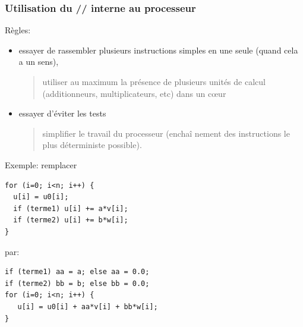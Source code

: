 \documentclass{beamer}
\begin{document}
\begin{frame}[fragile]
\frametitle{Utilisation du // interne au processeur}
Règles: 
\begin{itemize}
	\item essayer de rassembler plusieurs instructions simples en une seule (quand cela a un sens),
	\begin{quote}
		utiliser au maximum la pr\'esence de plusieurs unit\'es de calcul (additionneurs, multiplicateurs, etc) dans un c\oe ur
	\end{quote}
	\item  essayer d'\'eviter les tests
	\begin{quote}
		simplifier le travail du processeur (encha\^i nement des instructions le plus d\'eterministe possible).
	\end{quote}
\end{itemize}


\end{frame}

\begin{frame}[fragile]
Exemple: remplacer
\begin{lstlisting}
for (i=0; i<n; i++) {
  u[i] = u0[i];
  if (terme1) u[i] += a*v[i];
  if (terme2) u[i] += b*w[i];
}
\end{lstlisting}

par:
\begin{lstlisting}
if (terme1) aa = a; else aa = 0.0;
if (terme2) bb = b; else bb = 0.0;
for (i=0; i<n; i++) {
   u[i] = u0[i] + aa*v[i] + bb*w[i];
}
\end{lstlisting}

\end{frame}
\end{document}
